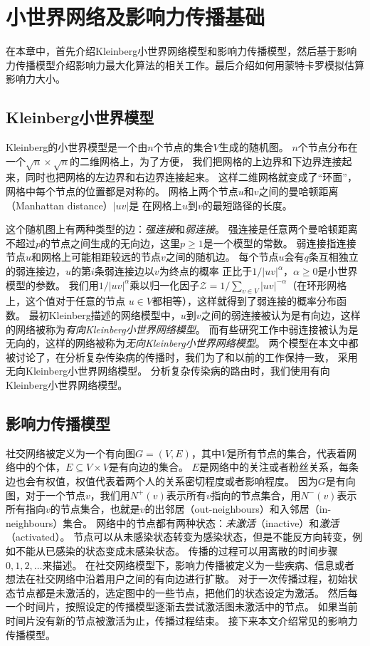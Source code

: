 
\chapter{小世界网络及影响力传播基础}
在本章中，首先介绍Kleinberg小世界网络模型和影响力传播模型，然后基于影响力传播模型介绍影响力最大化算法的相关工作。最后介绍如何用蒙特卡罗模拟估算影响力大小。

\section{Kleinberg小世界模型}
Kleinberg的小世界模型是一个由$n$个节点的集合$V$生成的随机图。
$n$个节点分布在一个$\sqrt{n} \times \sqrt{n}$的二维网格上\cite{Kleinberg2000small}，为了方便，
我们把网格的上边界和下边界连接起来，同时也把网格的左边界和右边界连接起来。
这样二维网格就变成了“环面”，网格中每个节点的位置都是对称的。
网格上两个节点$u$和$v$之间的曼哈顿距离（Manhattan distance）$|uv|$是
在网格上$u$到$v$的最短路径的长度。

这个随机图上有两种类型的边：{\it 强连接}和{\it 弱连接}。
强连接是任意两个曼哈顿距离不超过$p$的节点之间生成的无向边，这里$p \geq 1$是一个模型的常数。
弱连接指连接节点$u$和网格上可能相距较远的节点$v$之间的随机边。
每个节点$u$会有$q$条互相独立的弱连接边，$u$的第$i$条弱连接边以$v$为终点的概率
正比于$1/{|uv|}^\alpha$，$\alpha\geq 0$是小世界模型的参数。
我们用$1/{|uv|}^\alpha$乘以归一化因子$\mathcal{Z} = 1/\sum_{v\in V}|uv|^{-\alpha}$（在环形网格上，这个值对于任意的节点 $u\in V$都相等），这样就得到了弱连接的概率分布函数。
最初Kleinberg描述的网络模型\cite{Kleinberg2000small}中，$u$到$v$之间的弱连接被认为是有向边，这样的网络被称为{\it 有向Kleinberg小世界网络模型}。
而有些研究工作\cite{Ghasemiesfeh2013complex}中弱连接被认为是无向的，这样的网络被称为{\it 无向Kleinberg小世界网络模型}。
两个模型在本文中都被讨论了，在分析复杂传染病的传播时，我们为了和以前的工作保持一致，
采用无向Kleinberg小世界网络模型。
分析复杂传染病的路由时，我们使用有向Kleinberg小世界网络模型。

\section{影响力传播模型}
社交网络被定义为一个有向图$G=(V,E)$，其中$V$是所有节点的集合，代表着网络中的个体，$E\subseteq V \times V$是有向边的集合。
$E$是网络中的关注或者粉丝关系，每条边也会有权值，权值代表着两个人的关系密切程度或者影响程度。
因为$G$是有向图，对于一个节点$v$，我们用$N^+(v)$表示所有$v$指向的节点集合，用$N^-(v)$表示所有指向$v$的节点集合，也就是$v$的出邻居（out-neighbours）和入邻居（in-neighbours）集合。
网络中的节点都有两种状态：{\it 未激活}（inactive）和{\it 激活}（activated）。
节点可以从未感染状态转变为感染状态，但是不能反方向转变，例如不能从已感染的状态变成未感染状态。
传播的过程可以用离散的时间步骤$0,1,2,\ldots$来描述。
在社交网络模型下，影响力传播被定义为一些疾病、信息或者想法在社交网络中沿着用户之间的有向边进行扩散。
对于一次传播过程，初始状态节点都是未激活的，选定图中的一些节点，把他们的状态设定为激活。
然后每一个时间片，按照设定的传播模型逐渐去尝试激活图未激活中的节点。
如果当前时间片没有新的节点被激活为止，传播过程结束。
接下来本文介绍常见的影响力传播模型。


